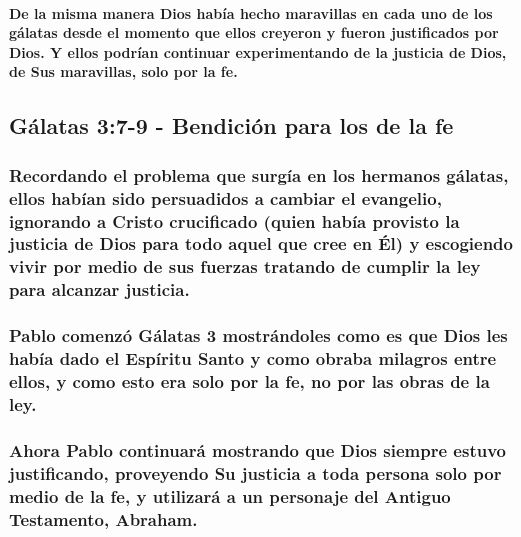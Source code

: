 \documentclass[11a pt,twoside]{article}
\let\oldsubsection\subsection
\renewcommand{\subsection}{\needspace{5\baselineskip}\oldsubsection}
\let\oldsubsubsection\subsubsection
\renewcommand{\subsubsection}{\needspace{4\baselineskip}\oldsubsubsection}
\let\oldparagraph\paragraph
\renewcommand{\paragraph}{\needspace{3\baselineskip}\oldparagraph}
\begin{document}
\paragraph{De la misma manera Dios había hecho maravillas en cada uno de
los gálatas desde el momento que ellos creyeron y fueron justificados
por Dios. Y ellos podrían continuar experimentando de la justicia de
Dios, de Sus maravillas, solo por la
fe.}\label{de-la-misma-manera-dios-habuxeda-hecho-maravillas-en-cada-uno-de-los-guxe1latas-desde-el-momento-que-ellos-creyeron-y-fueron-justificados-por-dios.-y-ellos-podruxedan-continuar-experimentando-de-la-justicia-de-dios-de-sus-maravillas-solo-por-la-fe.}

\subsection{Gálatas 3:7-9 - Bendición para los de la
fe}\label{guxe1latas-37-9---bendiciuxf3n-para-los-de-la-fe}

\subsubsection{Recordando el problema que surgía en los hermanos
gálatas, ellos habían sido persuadidos a cambiar el evangelio, ignorando
a Cristo crucificado (quien había provisto la justicia de Dios para todo
aquel que cree en Él) y escogiendo vivir por medio de sus fuerzas
tratando de cumplir la ley para alcanzar
justicia.}\label{recordando-el-problema-que-surguxeda-en-los-hermanos-guxe1latas-ellos-habuxedan-sido-persuadidos-a-cambiar-el-evangelio-ignorando-a-cristo-crucificado-quien-habuxeda-provisto-la-justicia-de-dios-para-todo-aquel-que-cree-en-uxe9l-y-escogiendo-vivir-por-medio-de-sus-fuerzas-tratando-de-cumplir-la-ley-para-alcanzar-justicia.}

\subsubsection{Pablo comenzó Gálatas 3 mostrándoles como es que Dios les
había dado el Espíritu Santo y como obraba milagros entre ellos, y como
esto era solo por la fe, no por las obras de la
ley.}\label{pablo-comenzuxf3-guxe1latas-3-mostruxe1ndoles-como-es-que-dios-les-habuxeda-dado-el-espuxedritu-santo-y-como-obraba-milagros-entre-ellos-y-como-esto-era-solo-por-la-fe-no-por-las-obras-de-la-ley.}

\subsubsection{Ahora Pablo continuará mostrando que Dios siempre estuvo
justificando, proveyendo Su justicia a toda persona solo por medio de la
fe, y utilizará a un personaje del Antiguo Testamento,
Abraham.}\label{ahora-pablo-continuaruxe1-mostrando-que-dios-siempre-estuvo-justificando-proveyendo-su-justicia-a-toda-persona-solo-por-medio-de-la-fe-y-utilizaruxe1-a-un-personaje-del-antiguo-testamento-abraham.}
\end{document}
